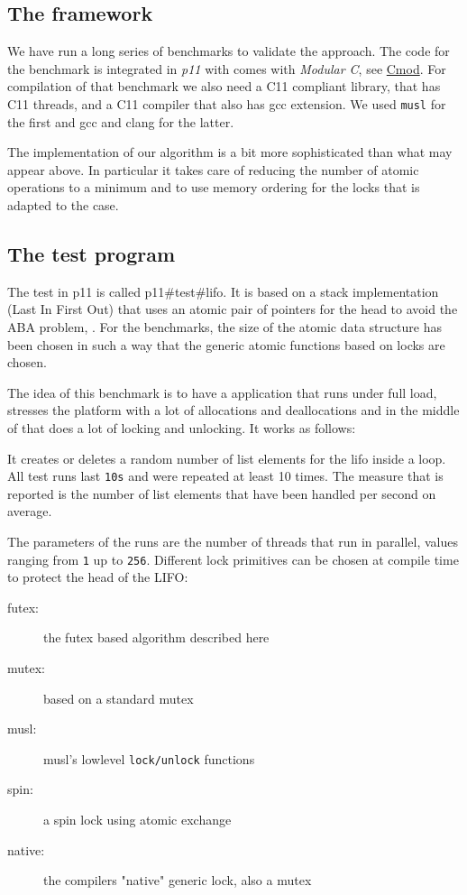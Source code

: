 \subsection{The framework}
\label{sec-4-1}

We have run a long series of benchmarks to validate the
approach. The code for the benchmark is integrated in \emph{p11} with
comes with \emph{Modular C}, see
\href{http://cmod.gforge.inria.fr}{Cmod}. For compilation of that
benchmark we also need a C11 compliant library, that has C11
threads, and a C11 compiler that also has gcc extension. We used
\texttt{musl} for the first and gcc and clang for the latter.

The implementation of our algorithm is a bit more sophisticated
than what may appear above. In particular it takes care of reducing
the number of atomic operations to a minimum and to use memory
ordering for the locks that is adapted to the case.

\subsection{The test program}
\label{sec-4-2}

The test in p11 is called p11\#test\#lifo. It is based on a stack
implementation (Last In First Out) that uses an atomic pair of
pointers for the head to avoid the ABA problem,
\cite{IBM370,michael04:aba}. For the benchmarks, the size of the atomic
data structure has been chosen in such a way that the generic
atomic functions based on locks are chosen.

The idea of this benchmark is to have a application that runs under
full load, stresses the platform with a lot of allocations and
deallocations and in the middle of that does a lot of locking and
unlocking. It works as follows:

It creates or deletes a random number of list elements for the lifo
inside a loop. All test runs last \texttt{10s} and were repeated at least
10 times. The measure that is reported is the number of list
elements that have been handled per second on average.

The parameters of the runs are the number of threads that run in
parallel, values ranging from \texttt{1} up to \texttt{256}.  Different lock
primitives can be chosen at compile time to protect the head of the
LIFO:\itemadjust

\begin{description}
\item[{futex:}] the futex based algorithm described here
\item[{mutex:}] based on a standard mutex
\item[{musl:}] musl's lowlevel \texttt{lock/unlock} functions
\item[{spin:}] a spin lock using atomic exchange
\item[{native:}] the compilers "native" generic lock, also a mutex
\end{description}


